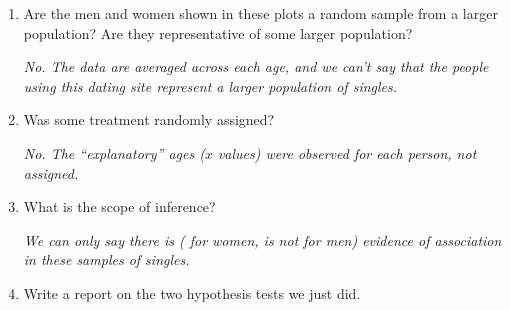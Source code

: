 \begin{enumerate}
\begin{enumerate}
 
\item Switch from slope to correlation. What is the sample
  correlation, and what is the p-value for a test of $H_0:\ \rho=0$
  versus $H_a:\ \rho > 0$?.
\begin{students}
 \vspace{1cm}      
\end{students}

\begin{key}
{\it $r = 0.982$ and the p-value is the same.}
\end{key}
  \end{enumerate}

  
\item Are the men and women shown in these plots a random sample from
  a larger population?  Are they representative of some larger population?
\begin{students}
 \vspace{2cm}      
\end{students}

\begin{key}
  {\it No.  The data are averaged across each age, and we can't say
    that the people using this dating site represent a larger
    population of singles.}
\end{key}

\item Was some  treatment  randomly assigned?
\begin{students}
 \vspace{1.5cm}      
\end{students}

\begin{key}
  {\it No.  The ``explanatory'' ages ($x$ values) were observed for
    each person, not assigned.} 
\end{key}

\item What is the scope of inference?
\begin{students}
 \vspace{1.5cm}      
\end{students}

\begin{key}
  {\it We can only say there is ( for women,  is not for men)
    evidence of association in these samples of singles.} 
\end{key}

\item Write a report on the two hypothesis tests we just did. \vfill
\end{enumerate}
 

